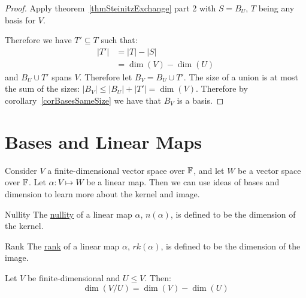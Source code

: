 \documentclass[../Main.tex]{subfiles}
\begin{document}
\begin{proof}
    Apply theorem~\ref{thmSteinitzExchange} part 2 with $S = B_U$, $T$ being any basis for $V$.

    Therefore we have $T' \subseteq T$ such that:
    \begin{align*}
        |T'| &= |T| - |S| \\
        &= \dim(V) - \dim(U)
    \end{align*}
    and $B_U \cup T'$ spans $V$. Therefore let $B_V = B_U \cup T'$. The size of a union is at most the sum of the sizes: $|B_V| \leq |B_U| + |T'| = \dim(V)$. Therefore by corollary~\ref{corBasesSameSize} we have that $B_V$ is a basis.
\end{proof}
\section{Bases and Linear Maps}
Consider $V$ a finite-dimensional vector space over $\mathbb{F}$, and let $W$ be a vector space over $\mathbb{F}$. Let $\alpha : V \mapsto W$ be a linear map. Then we can use ideas of bases and dimension to learn more about the kernel and image.
\begin{definition}{Nullity}
    The \underline{nullity} of a linear map $\alpha$, $n(\alpha)$, is defined to be the dimension of the kernel. 
\end{definition}
\begin{definition}{Rank}
    The \underline{rank} of a linear map $\alpha$, $rk(\alpha)$, is defined to be the dimension of the image.
\end{definition}
\begin{lemma}
    Let $V$ be finite-dimensional and $U \leq V$. Then:
    \begin{equation}
        \dim(V / U) = \dim(V) - \dim(U)
        \label{eqnQuotientSizes}
    \end{equation}
    \label{lemQuotientSizes}
\end{lemma}
\end{document}
